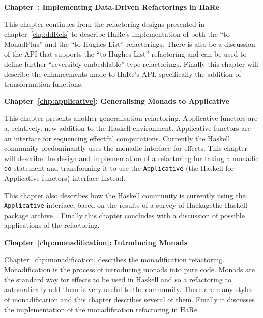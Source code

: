 \textbf{Chapter~\DIFdelbegin \DIFdel{\ref{generalImp}}\DIFdelend \DIFaddbegin \DIFadd{\ref{chp:generalImp}}\DIFaddend : Implementing Data-Driven Refactorings in HaRe}

This chapter continues \DIFdelbegin {}\DIFdelend from the refactoring designs presented in chapter~\ref{chp:ddRefs} to describe HaRe's implementation of both the ``\DIFdelbegin {}\DIFdelend \DIFaddbegin {}\DIFaddend to MonadPlus'' and the ``\DIFdelbegin {}\DIFdelend \DIFaddbegin {}\DIFaddend to Hughes List'' refactorings. There is also be a discussion of the API that  supports the ``\DIFdelbegin {}\DIFdelend \DIFaddbegin {}\DIFaddend to Hughes List'' refactoring and can be used to define further ``reversibly embeddable'' type refactorings. Finally this chapter will describe the enhancements made to HaRe's API, specifically the addition of \DIFdelbegin {}\DIFdelend \DIFaddbegin {}\DIFaddend transformation functions.

\textbf{Chapter~\ref{chp:applicative}: Generalising Monads to Applicative}

This chapter presents another generalisation refactoring. Applicative functors are a, relatively, new addition to the Haskell environment. Applicative functors are an interface for sequencing effectful computations. Currently the Haskell community predominantly uses the monadic interface for effects. This chapter will describe the design and implementation of a refactoring for taking a monadic \texttt{do} statement and transforming it to use the \texttt{Applicative} (the Haskell \DIFdelbegin {}\DIFdelend \DIFaddbegin {}\DIFaddend for Applicative functors) interface instead.

This chapter also describes how the Haskell community is currently using the \texttt{Applicative} interface, based on the results of a survey of Hackage\DIFaddbegin \DIFadd{, }\DIFaddend the Haskell package archive~\citep{hackage}. Finally this chapter concludes with a discussion of possible applications of the refactoring.

\textbf{Chapter~\ref{chp:monadification}: Introducing Monads} 

Chapter~\ref{chp:monadification} describes the monadification refactoring. Monadification is the process of introducing monads into pure code. Monads are the standard way for effects to be used in Haskell and so a refactoring to automatically add them is very useful to the community. There are many styles of monadification and this chapter describes several of them. Finally it discusses the implementation of the monadification refactoring in HaRe.

